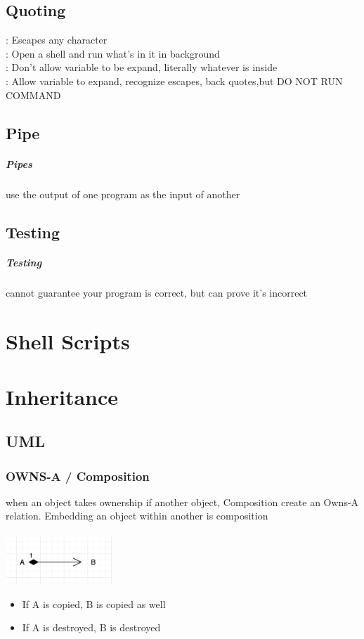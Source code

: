 \documentclass{report}
\begin{document}
\section{Quoting}
\ibx{\textbackslash}: Escapes any character\\
: Open a shell and run what's in it in background\\
: Don't allow variable to be expand, literally whatever is inside\\
: Allow variable to expand, recognize escapes, back quotes,but DO NOT RUN COMMAND
\section{Pipe}
\paragraph{Pipes} use the output of one program as the input of another

\section{Testing}
\paragraph{Testing}cannot guarantee your program is correct, but can prove it's incorrect

\chapter{Shell Scripts}
\chapter{Inheritance}
\section{UML}
\subsection{OWNS-A / Composition}
when an object takes ownership if another object, Composition create an Owns-A relation. 
Embedding an object within another is composition\\
\\
\includegraphics[width = 0.3\textwidth]{cs1}
\begin{itemize}
\item If A is copied, B is copied as well
\item If A is destroyed, B is destroyed
\end{itemize}
\end{document}
